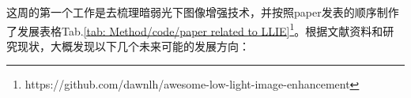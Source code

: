 \documentclass[letterpaper,12pt]{article}
\begin{document}
		这周的第一个工作是去梳理暗弱光下图像增强技术，并按照paper发表的顺序制作了发展表格Tab.\ref{tab: Method/code/paper related to LLIE}\footnote{https://github.com/dawnlh/awesome-low-light-image-enhancement}。根据文献资料和研究现状，大概发现以下几个未来可能的发展方向：
		
		\begin{table}[!htbp]
			\centering
			\tiny
\end{table}
\end{document}
